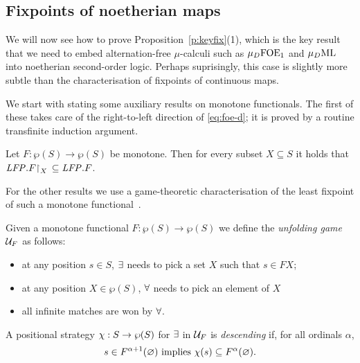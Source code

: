 \subsection{Fixpoints of noetherian maps}

We will now see how to prove Proposition~\ref{p:keyfix}(1), which is the key 
result that we need to embed alternation-free $\mu$-calculi such as 
$\mu_{D}\mathrm{FOE}_1$ and $\mu_{D}\mathrm{ML}$ into noetherian second-order logic.
Perhaps suprisingly, this case is slightly more subtle than the characterisation of
fixpoints of continuous maps.

%

We start with stating some auxiliary results on monotone functionals.
The first 
of these takes care of the right-to-left direction of \eqref{eq:foe-d}; it 
is proved by a routine transfinite induction argument.

\begin{proposition}
\label{p:afmc-1}
Let $F:  \wp(S)\to \wp(S)$ be monotone.
Then for every subset $X \subseteq S$ it holds that $\mathit{LFP}. F{\upharpoonright}_{X}\,\subseteq \mathit{LFP}.F$.
\end{proposition}

For the other results we use a game-theoretic characterisation of the least 
fixpoint of such a monotone functional~\cite{Ven08}.

\begin{definition}
\label{d:unfgame}
Given a monotone functional $F: \wp(S)\to \wp(S)$ we define the 
\emph{unfolding game} $\mathcal{U}_{F}$ as follows:
\begin{itemize}
\item at any position $s \in S$, $\exists$ needs to pick a set $X$ such that 
$s \in FX$;
\item at any position $X \in \wp(S)$, $\forall$ needs to pick an element of 
$X$
\item all infinite matches are won by $\forall$.
\end{itemize}
A positional strategy $\chi: S \to \wp(S)$ for $\exists$ in $\mathcal{U}_{F}$ is 
\emph{descending} if, for all ordinals $\alpha$,
\begin{equation}
\label{eq:dec}
s \in F^{\alpha+1}(\nada) \text{ implies } \ystrat(s) \sse F^{\alpha}(\nada).
\end{equation}
\end{definition}

